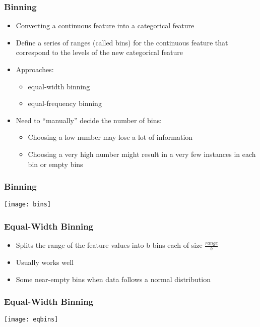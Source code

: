 \begin{frame}[fragile]\frametitle{Binning}	
\begin{itemize}
\item Converting a continuous feature into a categorical feature
\item Define a series of ranges (called bins) for the continuous feature that correspond to the levels of the new categorical feature
\item Approaches: 
	\begin{itemize}
	\item equal-width binning 
	\item equal-frequency binning 
	\end{itemize}
\item Need to ``manually'' decide the number of bins:
	\begin{itemize}
	\item Choosing a low number may lose a lot of information
	\item Choosing a very high number might result in a very few instances in each bin or empty bins
	\end{itemize}
\end{itemize}
\end{frame}

\begin{frame}[fragile]\frametitle{Binning}	
\begin{center}
\texttt{[image: bins]}
\end{center}
\end{frame}

\begin{frame}[fragile]\frametitle{Equal-Width Binning}	
\begin{itemize}
\item Splits the range of the feature values into b bins each of size $\frac{range}{b}$
\item Usually works well
\item Some near-empty bins when data follows a normal distribution
\end{itemize}
\end{frame}


\begin{frame}[fragile]\frametitle{Equal-Width Binning}	
\begin{center}
\texttt{[image: eqbins]}
\end{center}
\end{frame}


